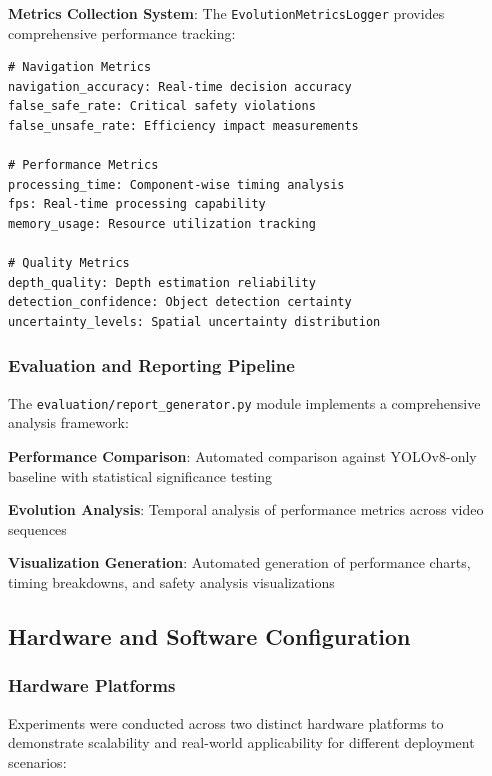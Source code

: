 \documentclass[10pt]{article}
\begin{document}
\textbf{Metrics Collection System}:
The \texttt{EvolutionMetricsLogger} provides comprehensive performance tracking:

\begin{verbatim}
# Navigation Metrics
navigation_accuracy: Real-time decision accuracy
false_safe_rate: Critical safety violations
false_unsafe_rate: Efficiency impact measurements

# Performance Metrics
processing_time: Component-wise timing analysis
fps: Real-time processing capability
memory_usage: Resource utilization tracking

# Quality Metrics
depth_quality: Depth estimation reliability
detection_confidence: Object detection certainty
uncertainty_levels: Spatial uncertainty distribution
\end{verbatim}

\subsubsection{Evaluation and Reporting Pipeline}

The \texttt{evaluation/report\_generator.py} module implements a comprehensive analysis framework:

\textbf{Performance Comparison}: Automated comparison against YOLOv8-only baseline with statistical significance testing

\textbf{Evolution Analysis}: Temporal analysis of performance metrics across video sequences

\textbf{Visualization Generation}: Automated generation of performance charts, timing breakdowns, and safety analysis visualizations

\subsection{Hardware and Software Configuration}

\subsubsection{Hardware Platforms}

Experiments were conducted across two distinct hardware platforms to demonstrate scalability and real-world applicability for different deployment scenarios:
\end{document}
